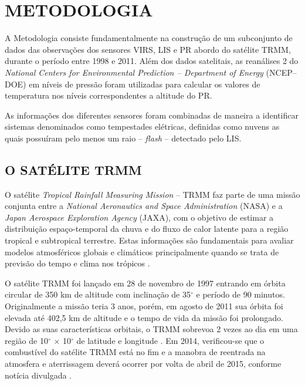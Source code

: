 \chapter{METODOLOGIA}
\label{metodologia}

A Metodologia consiste fundamentalmente na construção de um subconjunto de dados das observações dos sensores VIRS, LIS e PR abordo do satélite TRMM, durante o período entre 1998 e 2011. Além dos dados satelitais, as reanálises 2 do \textit{National Centers for Environmental Prediction -- Department of Energy
} (NCEP--DOE) em níveis de pressão foram utilizadas para calcular os valores de temperatura nos níveis correspondentes a altitude do PR.



As informações dos diferentes sensores foram combinadas de maneira a identificar sistemas denominados como tempestades elétricas, definidas como nuvens as quais possuíram pelo menos um raio -- \textit{flash} -- detectado pelo LIS. 


\section{O SATÉLITE TRMM}
\label{metodologiaTRMM}

O satélite \textit{Tropical Rainfall Measuring Mission} -- TRMM  faz parte de uma missão conjunta entre a \textit{National Aeronautics and Space Administration} (NASA) e a \textit{Japan Aerospace Exploration Agency} (JAXA),  com o objetivo de estimar a distribuição espaço-temporal da chuva e do fluxo de calor latente para a região tropical e subtropical terrestre. Estas informações são fundamentais para avaliar modelos atmosféricos globais e climáticos principalmente quando se trata de previsão do tempo e clima nos trópicos \cite{kummerok1998,simpson1988}.

  

O satélite TRMM foi lançado em 28 de novembro de 1997 entrando em órbita circular de 350 km de altitude com inclinação de 35$^{\circ}$ e período de 90 minutos. Originalmente a missão teria 3 anos, porém, em agosto de 2011 sua órbita foi elevada até 402,5 km de altitude e o tempo  de vida da missão foi prolongado. Devido as suas características orbitais, o TRMM sobrevoa 2 vezes ao dia em uma região de 10$^{\circ}$ $\times$ 10$^{\circ}$ de latitude e longitude \cite{simpson1988}. Em 2014, verificou-se que o combustível do satélite TRMM está no fim e a manobra de reentrada na atmosfera e aterrissagem deverá ocorrer por volta de abril de 2015, conforme notícia divulgada \cite{TRMMgoodbye}.
  
